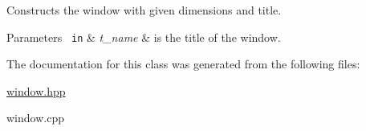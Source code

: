 Constructs the window with given dimensions and title. 


\begin{DoxyParams}[1]{Parameters}
\mbox{\texttt{ in}}  & {\em t\+\_\+name} & is the title of the window. \\
\hline
\end{DoxyParams}


The documentation for this class was generated from the following files\+:\begin{DoxyCompactItemize}
\item 
\mbox{\hyperlink{window_8hpp}{window.\+hpp}}\item 
window.\+cpp\end{DoxyCompactItemize}
